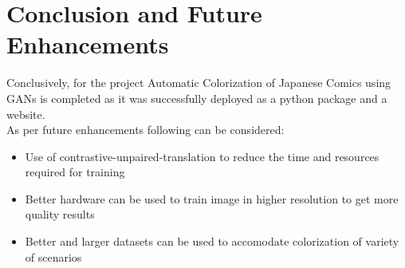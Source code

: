 \chapter{Conclusion and Future Enhancements}

Conclusively, for the project Automatic Colorization of Japanese Comics using GANs is completed as it was successfully deployed as a python package and a website.
\\
As per future enhancements following can be considered:
    \begin{itemize}
        \item Use of  contrastive-unpaired-translation to reduce the time and resources required for training\cite{park2020contrastive}
        \item Better hardware can be used to train image in higher resolution to get more quality results
        \item Better and larger datasets can be used to accomodate colorization of variety of scenarios
    \end{itemize}